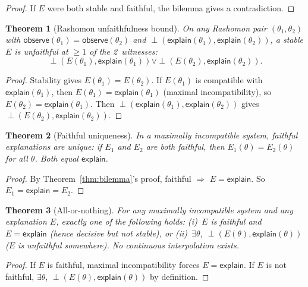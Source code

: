 \documentclass[11pt,a4paper]{article}
\newtheorem{theorem}{Theorem}[section]
\newcommand{\incomp}{\perp}
\begin{document}
\begin{proof}
If $E$ were both stable and faithful, the bilemma gives a contradiction.
\end{proof}

\begin{theorem}[Rashomon unfaithfulness bound]
\label{thm:rashomon-unfaithfulness}
On any Rashomon pair $(\theta_1, \theta_2)$ with $\mathsf{observe}(\theta_1) = \mathsf{observe}(\theta_2)$ and $\incomp(\mathsf{explain}(\theta_1), \mathsf{explain}(\theta_2))$, a stable $E$ is unfaithful at $\geq 1$ of the 2~witnesses:
\[
\incomp(E(\theta_1), \mathsf{explain}(\theta_1)) \lor \incomp(E(\theta_2), \mathsf{explain}(\theta_2)).
\]
\end{theorem}

\begin{proof}
Stability gives $E(\theta_1) = E(\theta_2)$.  If $E(\theta_1)$ is compatible with $\mathsf{explain}(\theta_1)$, then $E(\theta_1) = \mathsf{explain}(\theta_1)$ (maximal incompatibility), so $E(\theta_2) = \mathsf{explain}(\theta_1)$.  Then $\incomp(\mathsf{explain}(\theta_1), \mathsf{explain}(\theta_2))$ gives $\incomp(E(\theta_2), \mathsf{explain}(\theta_2))$.
\end{proof}

\begin{theorem}[Faithful uniqueness]
\label{thm:faithful-unique}
In a maximally incompatible system, faithful explanations are unique: if $E_1$ and $E_2$ are both faithful, then $E_1(\theta) = E_2(\theta)$ for all $\theta$.  Both equal $\mathsf{explain}$.
\end{theorem}

\begin{proof}
By Theorem~\ref{thm:bilemma}'s proof, faithful $\Rightarrow$ $E = \mathsf{explain}$.  So $E_1 = \mathsf{explain} = E_2$.
\end{proof}

\begin{theorem}[All-or-nothing]
\label{thm:all-or-nothing}
For any maximally incompatible system and any explanation $E$, exactly one of the following holds:
(i)~$E$ is faithful and $E = \mathsf{explain}$ (hence decisive but not stable), or
(ii)~$\exists \theta$, $\incomp(E(\theta), \mathsf{explain}(\theta))$ ($E$ is unfaithful somewhere).
No continuous interpolation exists.
\end{theorem}

\begin{proof}
If $E$ is faithful, maximal incompatibility forces $E = \mathsf{explain}$.  If $E$ is not faithful, $\exists \theta$, $\incomp(E(\theta), \mathsf{explain}(\theta))$ by definition.
\end{proof}
\end{document}
